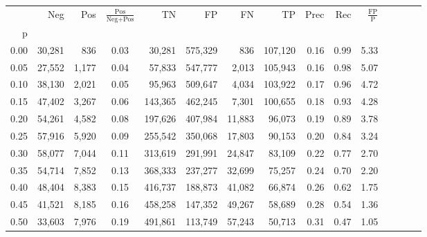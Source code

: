 \begin{tabular}{rrrcrrrrrrrrrrr}
\toprule
{} &     Neg &    Pos & $\frac{\text{Pos}}{\text{Neg}+\text{Pos}}$ &       TN &       FP &       FN &       TP &  Prec &   Rec & $\frac{\text{FP}}{\text{P}}$ \\
p    &         &        &                                            &          &          &          &          &       &       &                              \\
\midrule
0.00 &  30,281 &    836 &                                       0.03 &   30,281 &  575,329 &      836 &  107,120 &  0.16 &  0.99 &                         5.33 \\
0.05 &  27,552 &  1,177 &                                       0.04 &   57,833 &  547,777 &    2,013 &  105,943 &  0.16 &  0.98 &                         5.07 \\
0.10 &  38,130 &  2,021 &                                       0.05 &   95,963 &  509,647 &    4,034 &  103,922 &  0.17 &  0.96 &                         4.72 \\
0.15 &  47,402 &  3,267 &                                       0.06 &  143,365 &  462,245 &    7,301 &  100,655 &  0.18 &  0.93 &                         4.28 \\
0.20 &  54,261 &  4,582 &                                       0.08 &  197,626 &  407,984 &   11,883 &   96,073 &  0.19 &  0.89 &                         3.78 \\
0.25 &  57,916 &  5,920 &                                       0.09 &  255,542 &  350,068 &   17,803 &   90,153 &  0.20 &  0.84 &                         3.24 \\
0.30 &  58,077 &  7,044 &                                       0.11 &  313,619 &  291,991 &   24,847 &   83,109 &  0.22 &  0.77 &                         2.70 \\
0.35 &  54,714 &  7,852 &                                       0.13 &  368,333 &  237,277 &   32,699 &   75,257 &  0.24 &  0.70 &                         2.20 \\
0.40 &  48,404 &  8,383 &                                       0.15 &  416,737 &  188,873 &   41,082 &   66,874 &  0.26 &  0.62 &                         1.75 \\
0.45 &  41,521 &  8,185 &                                       0.16 &  458,258 &  147,352 &   49,267 &   58,689 &  0.28 &  0.54 &                         1.36 \\
0.50 &  33,603 &  7,976 &                                       0.19 &  491,861 &  113,749 &   57,243 &   50,713 &  0.31 &  0.47 &                         1.05 \\

\end{tabular}
